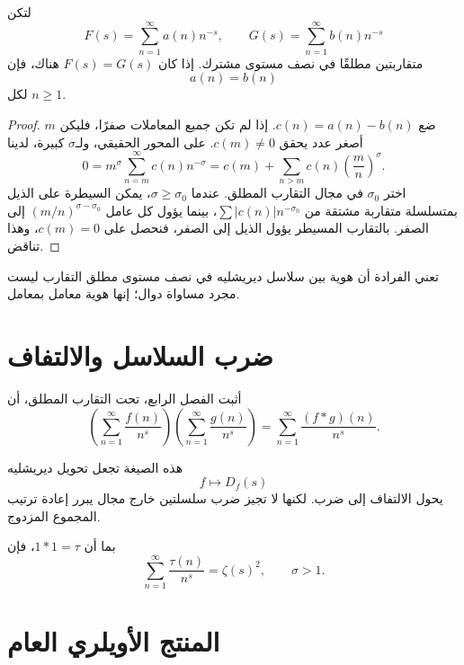 \begin{theorem}
\label{thm:dirichlet-series-uniqueness}
\provedhere
لتكن
\[
F(s)=\sum_{n=1}^{\infty}a(n)n^{-s},
\qquad
G(s)=\sum_{n=1}^{\infty}b(n)n^{-s}
\]
متقاربتين مطلقًا في نصف مستوى مشترك. إذا كان \(F(s)=G(s)\) هناك، فإن
\[
a(n)=b(n)
\]
لكل \(n\geq1\).
\end{theorem}

\begin{proof}
ضع \(c(n)=a(n)-b(n)\). إذا لم تكن جميع المعاملات صفرًا، فليكن \(m\)
أصغر عدد يحقق \(c(m)\neq0\). على المحور الحقيقي، ولـ\(\sigma\) كبيرة، لدينا
\[
0=m^\sigma\sum_{n=m}^{\infty}c(n)n^{-\sigma}
=
c(m)+
\sum_{n>m}c(n)\left(\frac{m}{n}\right)^\sigma.
\]
اختر \(\sigma_0\) في مجال التقارب المطلق. عندما \(\sigma\geq\sigma_0\)،
يمكن السيطرة على الذيل بمتسلسلة متقاربة مشتقة من
\(\sum |c(n)|n^{-\sigma_0}\)، بينما يؤول كل عامل
\((m/n)^{\sigma-\sigma_0}\) إلى الصفر. بالتقارب المسيطر يؤول الذيل إلى
الصفر، فنحصل على \(c(m)=0\)، وهذا تناقض.
\end{proof}

\begin{remark}
تعني الفرادة أن هوية بين سلاسل ديريشليه في نصف مستوى مطلق التقارب ليست
مجرد مساواة دوال؛ إنها هوية معامل بمعامل.
\end{remark}

\section{ضرب السلاسل والالتفاف}

أثبت الفصل الرابع، تحت التقارب المطلق، أن
\[
\left(\sum_{n=1}^{\infty}\frac{f(n)}{n^s}\right)
\left(\sum_{n=1}^{\infty}\frac{g(n)}{n^s}\right)
=
\sum_{n=1}^{\infty}\frac{(f*g)(n)}{n^s}.
\]

هذه الصيغة تجعل تحويل ديريشليه
\[
f\longmapsto D_f(s)
\]
يحول الالتفاف إلى ضرب. لكنها لا تجيز ضرب سلسلتين خارج مجال يبرر إعادة
ترتيب المجموع المزدوج.

\begin{example}
بما أن \(1*1=\tau\)، فإن
\[
\sum_{n=1}^{\infty}\frac{\tau(n)}{n^s}
=
\zeta(s)^2,
\qquad \sigma>1.
\]
\end{example}

\section{المنتج الأويلري العام}


